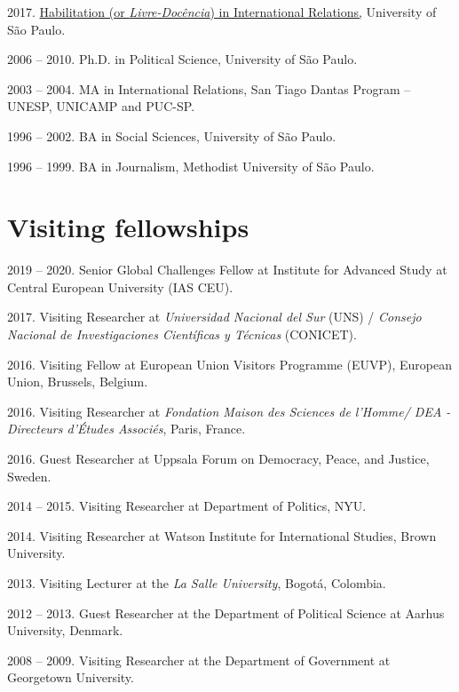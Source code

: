 \documentclass[a4paper,11.5pt]{article}
\renewenvironment{itemize}{
	\begin{list}{}{
			\setlength{\leftmargin}{1.5em}
		}
		}{
	\end{list}
}
\begin{document}
\begin{itemize}
	\item 2017. \href{https://en.wikipedia.org/wiki/Habilitation}{Habilitation (or \emph{Livre-Docência}) in International Relations,} University of São Paulo.
	\item 2006 -- 2010. Ph.D. in Political Science, University of São Paulo.
	\item 2003 -- 2004. MA in International Relations, San Tiago Dantas Program – UNESP, UNICAMP and PUC-SP.
	\item 1996 -- 2002. BA in Social Sciences, University of São Paulo.
	\item 1996 -- 1999. BA in Journalism, Methodist University of São Paulo.
\end{itemize}

\section*{Visiting fellowships}

\begin{itemize}
	
	\item 2019 -- 2020. Senior Global Challenges Fellow at Institute for Advanced Study at Central European University (IAS CEU).
	
	\item 2017. Visiting Researcher at \emph{Universidad Nacional del Sur} (UNS) / \emph{Consejo Nacional de Investigaciones Científicas y Técnicas} (CONICET).
	
	\item 2016. Visiting Fellow at European Union Visitors Programme (EUVP), European Union, Brussels, Belgium.
	
	\item 2016. Visiting Researcher at \emph{Fondation Maison des Sciences de l’Homme/ DEA - Directeurs d'Études Associés}, Paris, France.
	
	\item 2016. Guest Researcher at Uppsala Forum on Democracy, Peace, and Justice, Sweden.
	
	\item 2014 -- 2015. Visiting Researcher at Department of Politics, NYU.
	
	\item 2014. Visiting Researcher at Watson Institute for International Studies, Brown University.
	
	\item 2013. Visiting Lecturer at the \emph{La Salle University}, Bogotá, Colombia.
	
	\item  2012 -- 2013. Guest Researcher at the Department of Political Science at Aarhus University, Denmark.
	
	\item  2008 -- 2009. Visiting Researcher at the Department of Government at Georgetown University.
	
\end{itemize}
\end{document}
